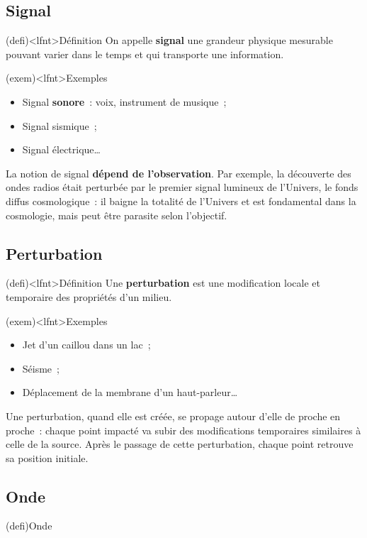 \documentclass[../../main/main.tex]{subfiles}
\begin{document}
\subsection{Signal}
\begin{tcn}(defi)<lfnt>{\tiny Définition}
	On appelle \textbf{signal} une grandeur physique mesurable pouvant varier
	dans le temps et qui transporte une information.
\end{tcn}
\begin{tcn}(exem)<lfnt>{Exemples}
	\begin{itemize}
		\item Signal \textbf{sonore}~: voix, instrument de musique~;
		\item Signal sismique~;
		\item Signal électrique…
	\end{itemize}
\end{tcn}
La notion de signal \textbf{dépend de l'observation}. Par exemple, la découverte
des ondes radios était perturbée par le premier signal lumineux de l'Univers, le
fonds diffus cosmologique~: il baigne la totalité de l'Univers et est
fondamental dans la cosmologie, mais peut être parasite selon l'objectif.

\subsection{Perturbation}

\begin{tcn}(defi)<lfnt>{\tiny Définition}
	Une \textbf{perturbation} est une modification locale et temporaire des
	propriétés d'un milieu.
\end{tcn}
\begin{tcn}(exem)<lfnt>{Exemples}
	\begin{itemize}
		\item Jet d'un caillou dans un lac~;
		\item Séisme~;
		\item Déplacement de la membrane d'un haut-parleur…
	\end{itemize}
\end{tcn}
Une perturbation, quand elle est créée, se propage autour d'elle de proche en
proche~: chaque point impacté va subir des modifications temporaires similaires
à celle de la source. Après le passage de cette perturbation, chaque point
retrouve sa position initiale.

\subsection{Onde}
\begin{tcb}(defi){Onde}
\end{tcb}
\end{document}

